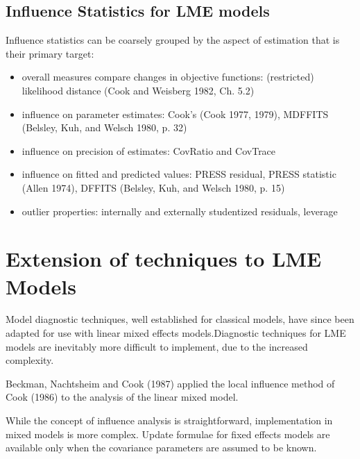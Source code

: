 \documentclass[Main.tex]{subfiles}
\begin{document}
			\subsection{Influence Statistics for LME models} %
			Influence statistics can be coarsely grouped by the aspect of estimation that is their primary target:
			\begin{itemize}
				\item overall measures compare changes in objective functions: (restricted) likelihood distance (Cook and Weisberg 1982, Ch. 5.2)
				\item influence on parameter estimates: Cook's  (Cook 1977, 1979), MDFFITS (Belsley, Kuh, and Welsch 1980, p. 32)
				\item influence on precision of estimates: CovRatio and CovTrace
				\item influence on fitted and predicted values: PRESS residual, PRESS statistic (Allen 1974), DFFITS (Belsley, Kuh, and Welsch 1980, p. 15)
				\item outlier properties: internally and externally studentized residuals, leverage
			\end{itemize}



		
		
		\newpage
		\section{Extension of techniques to LME Models} %
		
		Model diagnostic techniques, well established for classical models, have since been adapted for use with linear mixed effects models.Diagnostic techniques for LME models are inevitably more difficult to implement, due to the increased complexity.
		
		Beckman, Nachtsheim and Cook (1987) \citet{Beckman} applied the local influence method of Cook (1986) to the analysis of the linear mixed model.
		
		While the concept of influence analysis is straightforward, implementation in mixed models is more complex. Update formulae for fixed effects models are available only when the covariance parameters are assumed to be known.
		
\end{document}
